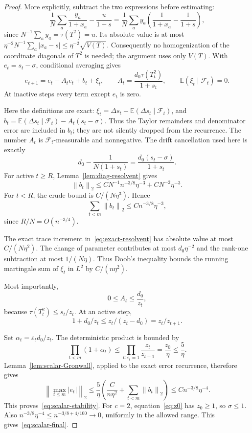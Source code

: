 \documentclass[11pt]{article}
\theoremstyle{definition}\newtheorem{definition}[theorem]{Definition}
\theoremstyle{remark}\newtheorem{remark}[theorem]{Remark}
\newcommand{\E}{\mathbb E}
\newcommand{\norm}[1]{\left\lVert#1\right\rVert}
\begin{document}
\begin{proof}
More explicitly, subtract the two expressions before estimating:
\[
 \frac1N\sum_a\frac{y_a}{1+x_a}-\frac{u}{1+s}
 =\frac1N\sum_a y_a\left(\frac1{1+x_a}-\frac1{1+s}\right),
\]
since $N^{-1}\sum_a y_a=\tau(T^2)=u$. Its absolute value is at most
$\eta^{-2}N^{-1}\sum_a|x_a-s|\le\eta^{-2}\sqrt{V(T)}$.
Consequently no homogenization of the coordinate diagonals of $T^2$ is needed; the argument uses only $V(T)$.
 With $e_t=s_t-\sigma$, conditional averaging gives
\begin{equation}\label{eq:error-rec}
 e_{t+1}=e_t+A_te_t+b_t+\xi_t,\qquad
 A_t=\frac{d_0\tau(T_t^2)}{1+s_t},\qquad
 \E(\xi_t\mid\mathcal F_t)=0.
\end{equation}
At inactive steps every term except $e_t$ is zero.

Here the definitions are exact: $\xi_t=\Delta s_t-\E(\Delta s_t\mid\mathcal F_t)$, and
$b_t=\E(\Delta s_t\mid\mathcal F_t)-A_t(s_t-\sigma)$. Thus the Taylor remainders and denominator error are included in $b_t$; they are not silently dropped from the recurrence. The number $A_t$ is $\mathcal F_t$-measurable and nonnegative.
 The drift cancellation used here is exactly
\[
 d_0-\frac1{N(1+s_t)}=\frac{d_0(s_t-\sigma)}{1+s_t}.
\]
For active $t\ge R$, Lemma~\ref{lem:diag-resolvent} gives
\[
 \norm{b_t}_2\le C N^{-1}n^{-3/8}\eta^{-3}
                  +C N^{-2}\eta^{-3}.
\]
For $t<R$, the crude bound is $C/(N\eta^3)$. Hence
\begin{equation}\label{eq:b-sum}
 \sum_{t<m}\norm{b_t}_2\le C n^{-3/8}\eta^{-3},
\end{equation}
since $R/N=O(n^{-3/4})$.

The exact trace increment in~\eqref{eq:exact-resolvent} has absolute value at most $C/(N\eta^2)$. The change of parameter contributes at most $d_0\eta^{-2}$ and the rank-one subtraction at most $1/(N\eta)$. Thus Doob's inequality bounds the running martingale sum of $\xi_t$ in $L^2$ by $C/(n\eta^2)$.

Most importantly,
\begin{equation}\label{eq:stability-coefficient}
 0\le A_t\le\frac{d_0}{z_t},
\end{equation}
because $\tau(T_t^2)\le s_t/z_t$. At an active step,
\[
 1+d_0/z_t\le z_t/(z_t-d_0)=z_t/z_{t+1}.
\]

Set $\alpha_t=\varepsilon_t d_0/z_t$. The deterministic product is bounded by
\begin{equation}\label{eq:telescoping-stability-product}
 \prod_{t<m}(1+\alpha_t)
 \le\prod_{t:\varepsilon_t=1}\frac{z_t}{z_{t+1}}
 =\frac{z_0}{\eta}\le\frac5\eta.
\end{equation}
Lemma~\ref{lem:scalar-Gronwall}, applied to the exact error recurrence, therefore gives
\[
 \norm{\max_{t\le m}|e_t|}_2
 \le\frac5\eta\left(\frac C{n\eta^2}
                       +\sum_{t<m}\norm{b_t}_2\right)
 \le C n^{-3/8}\eta^{-4}.
\]
This proves~\eqref{eq:scalar-stability}. For $c=2$, equation~\eqref{eq:z0} has $z_0\ge1$, so $\sigma\le1$. Also $n^{-3/8}\eta^{-4}\le n^{-3/8+4/100}\to0$, uniformly in the allowed range. This gives~\eqref{eq:scalar-final}.


\end{proof}
\end{document}
